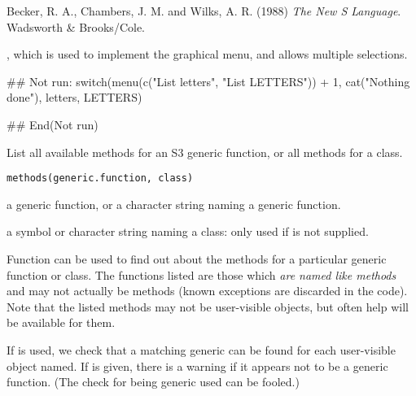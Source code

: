%
\begin{References}\relax
Becker, R. A., Chambers, J. M. and Wilks, A. R. (1988)
\emph{The New S Language}.
Wadsworth \& Brooks/Cole.
\end{References}
%
\begin{SeeAlso}\relax
{}, which is used to implement the graphical
menu, and allows multiple selections.
\end{SeeAlso}
%
\begin{Examples}
\begin{ExampleCode}
## Not run: 
switch(menu(c("List letters", "List LETTERS")) + 1,
       cat("Nothing done\n"), letters, LETTERS)

## End(Not run)
\end{ExampleCode}
\end{Examples}
%
\begin{Description}\relax
List all available methods for an S3 generic function, or all
methods for a class.
\end{Description}
%
\begin{Usage}
\begin{verbatim}
methods(generic.function, class)
\end{verbatim}
\end{Usage}
%
\begin{Arguments}
\begin{ldescription}
\item[\code{generic.function}] a generic function, or a character string naming a
generic function.
\item[\code{class}] a symbol or character string naming a class: only used if
 is not supplied.
\end{ldescription}
\end{Arguments}
%
\begin{Details}\relax
Function  can be used to find out about the methods for
a particular generic function or class.  The functions listed are those
which \emph{are named like methods} and may not actually be methods
(known exceptions are discarded in the code).  Note that the listed
methods may not be user-visible objects, but often help will be
available for them.

If  is used, we check that a matching generic can be found
for each user-visible object named.  If  is
given, there is a warning if it appears not to be a generic function.
(The check for being generic used can be fooled.)
\end{Details}
